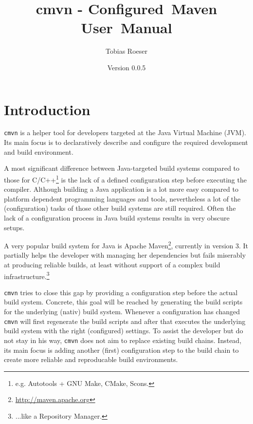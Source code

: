 \documentclass[a4paper,12pt,english,oneside,halfparskip]{scrartcl}
\title{cmvn - Configured~Maven User~Manual}
\author{Tobias Roeser}
\date{Version 0.0.5}
\newcommand{\CMVN}{\texttt{cmvn}}
\newcommand{\cmvn}{\texttt{cmvn}}
\newcommand{\VERSION}{0.1.0}
\begin{document}
\renewcommand{\labelitemi}{$\triangleright$}

\maketitle

% 

\clearpage

\ifpdf{}\fi
\tableofcontents

\clearpage

\section{Introduction}

\CMVN{} is a helper tool for developers targeted at the Java Virtual Machine (JVM). Its main focus is to declaratively describe and configure the required development and build environment. 

A most significant difference between Java-targeted build systems compared to those for C/C++\footnote{e.g. Autotools + GNU Make, CMake, Scons.} is the lack of a defined configuration step before executing the compiler. Although building a Java application is a lot more easy compared to platform dependent programming languages and tools, nevertheless a lot of the (configuration) tasks of those other build systems are still required. Often the lack of a configuration process in Java build systems results in very obscure setups.

A very popular build system for Java is Apache Maven\footnote{\url{http://maven.apache.org}}, currently in version 3. It partially helps the developer with managing her dependencies but fails miserably at producing reliable builds, at least without support of a complex build infrastructure.\footnote{...like a Repository Manager.}

\CMVN{} tries to close this gap by providing a configuration step before the actual build system. Concrete, this goal will be reached by generating the build scripts for the underlying (nativ) build system. Whenever a configuration has changed \cmvn{} will first regenerate the build scripts and after that executes the underlying build system with the right (configured) settings. To assist the developer but do not stay in his way, \CMVN{} does not aim to replace existing build chains. Instead, its main focus is adding another (first) configuration step to the build chain to create more reliable and reproducable build environments.
\end{document}
